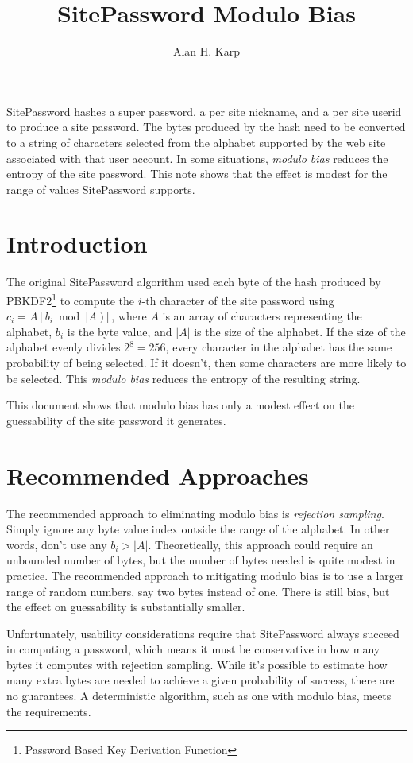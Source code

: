 \documentclass[11pt, oneside]{article}   	%
\title{SitePassword Modulo Bias}
\author{Alan H. Karp}
\begin{document}
\maketitle
\abstract

SitePassword hashes  a super password, a per site nickname, and a per site userid to produce a site password.  The bytes produced by the hash need to be converted to a string of characters selected from the alphabet supported by the web site associated with that user account.  In some situations, {\em modulo bias} reduces the entropy of the site password.  This note shows that the effect is modest for the range of values SitePassword supports.

\section{Introduction}

The original SitePassword algorithm used each byte of the hash produced by PBKDF2\footnote{Password Based Key Derivation Function} to compute the $i$-th character of the site password using $c_i = A[b_i  \bmod  |A|)]$, where $A$ is an array of characters representing the alphabet, $b_i$ is the byte value, and $|A|$ is the size of the alphabet.  If the size of the alphabet evenly divides $2^8 = 256$, every character in the alphabet has the same probability of being selected.  If it doesn't, then some characters are more likely to be selected.  This {\em modulo bias} reduces the entropy of the resulting string.  
 

This document shows that modulo bias has only a modest effect on the guessability of the site password it generates.

\section{Recommended Approaches}

The recommended approach to eliminating modulo bias is {\em rejection sampling}.  Simply ignore any byte value index outside the range of the alphabet.  In other words, don't use any $b_i > |A|$.  Theoretically, this approach could require an unbounded number of bytes, but the number of bytes needed is quite modest in practice.  The recommended approach to mitigating modulo bias is to use a larger range of random numbers, say two bytes instead of one.  There is still bias, but the effect on guessability is substantially smaller.

Unfortunately, usability considerations require that SitePassword always succeed in computing a password, which means it must be conservative in how many bytes it computes with rejection sampling.  While it's possible to estimate how many extra bytes are needed to achieve a given probability of success, there are no guarantees.  A deterministic algorithm, such as one with modulo bias, meets the requirements.
\end{document}
